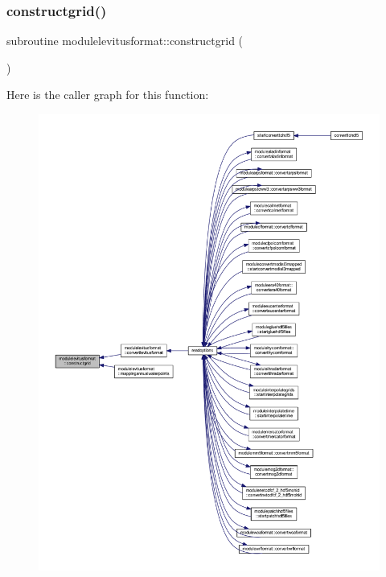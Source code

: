 \subsubsection{\texorpdfstring{constructgrid()}{constructgrid()}}
{\footnotesize\ttfamily subroutine modulelevitusformat\+::constructgrid (\begin{DoxyParamCaption}{ }\end{DoxyParamCaption})\hspace{0.3cm}{\ttfamily [private]}}

Here is the caller graph for this function\+:\nopagebreak
\begin{figure}[H]
\begin{center}
\leavevmode
\includegraphics[width=350pt]{namespacemodulelevitusformat_a8d2f6c0620be1ea52eadbd9f59b02100_icgraph}
\end{center}
\end{figure}
\mbox{\label{namespacemodulelevitusformat_a7849fb124c87ab2b4867b47c45ae92db}} 
